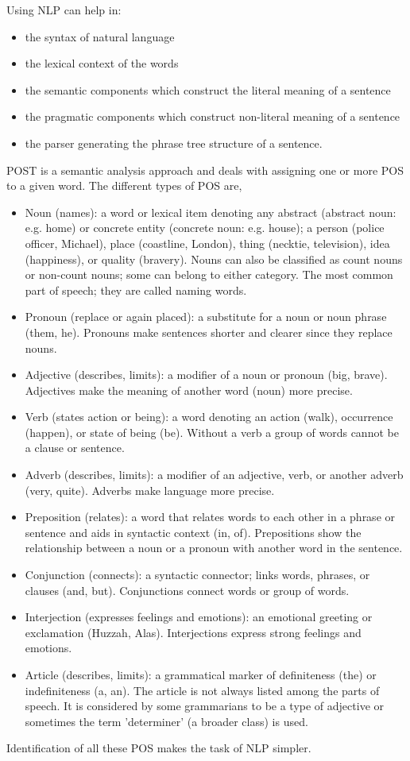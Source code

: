 \begin{multicols*}{2}
	Using \gls{NLP} can help in:
	\begin{itemize}
		\item the syntax of natural language
		\item the lexical context of the words
		\item the semantic components which construct the literal meaning of a sentence
		\item the pragmatic components which construct non-literal meaning of a sentence
		\item the parser generating the phrase tree structure of a sentence.
	\end{itemize}
	\gls{POST} is a semantic analysis approach and deals with assigning one or more \gls{POS} to a given word. The different types of \gls{POS} are,
	\begin{itemize}
		\item Noun (names): a word or lexical item denoting any abstract (abstract noun: e.g. home) or concrete entity (concrete noun: e.g. house); a person (police officer, Michael), place (coastline, London), thing (necktie, television), idea (happiness), or quality (bravery). Nouns can also be classified as count nouns or non-count nouns; some can belong to either category. The most common part of speech; they are called naming words.
		\item Pronoun (replace or again placed): a substitute for a noun or noun phrase (them, he). Pronouns make sentences shorter and clearer since they replace nouns.
		\item Adjective (describes, limits): a modifier of a noun or pronoun (big, brave). Adjectives make the meaning of another word (noun) more precise.
		\item Verb (states action or being): a word denoting an action (walk), occurrence (happen), or state of being (be). Without a verb a group of words cannot be a clause or sentence.
		\item Adverb (describes, limits): a modifier of an adjective, verb, or another adverb (very, quite). Adverbs make language more precise.
		\item Preposition (relates): a word that relates words to each other in a phrase or sentence and aids in syntactic context (in, of). Prepositions show the relationship between a noun or a pronoun with another word in the sentence.
		\item Conjunction (connects): a syntactic connector; links words, phrases, or clauses (and, but). Conjunctions connect words or group of words.
		\item Interjection (expresses feelings and emotions): an emotional greeting or exclamation (Huzzah, Alas). Interjections express strong feelings and emotions.
		\item Article (describes, limits): a grammatical marker of definiteness (the) or indefiniteness (a, an). The article is not always listed among the parts of speech. It is considered by some grammarians to be a type of adjective or sometimes the term 'determiner' (a broader class) is used.
	\end{itemize}
	Identification of all these \gls{POS} makes the task of \gls{NLP} simpler.
\end{multicols*}